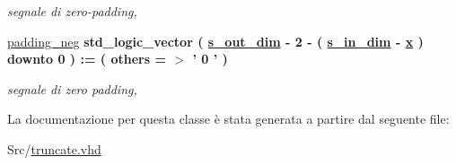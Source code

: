 \begin{DoxyCompactItemize}
\begin{DoxyCompactList}\small\item\em segnale di zero-\/padding, \end{DoxyCompactList}\item 
\hypertarget{classtruncate_1_1dataflow_ga130836df2917c4b75d1fc24500082e76}{\hyperlink{group___truncation_ga130836df2917c4b75d1fc24500082e76}{padding\+\_\+neg} {\bfseries \textcolor{vhdlchar}{std\+\_\+logic\+\_\+vector}\textcolor{vhdlchar}{ }\textcolor{vhdlchar}{(}\textcolor{vhdlchar}{ }\textcolor{vhdlchar}{ }\textcolor{vhdlchar}{ }\textcolor{vhdlchar}{ }{\bfseries \hyperlink{group___truncation_ga8b62f8bfecb0fab845995b8b051101bc}{s\+\_\+out\+\_\+dim}} \textcolor{vhdlchar}{-\/}\textcolor{vhdlchar}{ } \textcolor{vhdldigit}{2} \textcolor{vhdlchar}{-\/}\textcolor{vhdlchar}{ }\textcolor{vhdlchar}{(}\textcolor{vhdlchar}{ }\textcolor{vhdlchar}{ }\textcolor{vhdlchar}{ }\textcolor{vhdlchar}{ }{\bfseries \hyperlink{group___truncation_gad3d18243ad6fe53a2277e2aa9b94ca45}{s\+\_\+in\+\_\+dim}} \textcolor{vhdlchar}{-\/}\textcolor{vhdlchar}{ }\textcolor{vhdlchar}{ }\textcolor{vhdlchar}{ }{\bfseries \hyperlink{group___truncation_ga63701d8af27da7452a7588efcff357bc}{x}} \textcolor{vhdlchar}{ }\textcolor{vhdlchar}{)}\textcolor{vhdlchar}{ }\textcolor{vhdlchar}{ }\textcolor{vhdlchar}{downto}\textcolor{vhdlchar}{ }\textcolor{vhdlchar}{ } \textcolor{vhdldigit}{0} \textcolor{vhdlchar}{ }\textcolor{vhdlchar}{)}\textcolor{vhdlchar}{ }\textcolor{vhdlchar}{ }\textcolor{vhdlchar}{ }\textcolor{vhdlchar}{\+:}\textcolor{vhdlchar}{=}\textcolor{vhdlchar}{ }\textcolor{vhdlchar}{(}\textcolor{vhdlchar}{ }\textcolor{vhdlchar}{ }\textcolor{vhdlchar}{others}\textcolor{vhdlchar}{ }\textcolor{vhdlchar}{ }\textcolor{vhdlchar}{=}\textcolor{vhdlchar}{ }\textcolor{vhdlchar}{$>$}\textcolor{vhdlchar}{ }\textcolor{vhdlchar}{'}\textcolor{vhdlchar}{ } \textcolor{vhdldigit}{0} \textcolor{vhdlchar}{ }\textcolor{vhdlchar}{'}\textcolor{vhdlchar}{ }\textcolor{vhdlchar}{)}\textcolor{vhdlchar}{ }} }\label{classtruncate_1_1dataflow_ga130836df2917c4b75d1fc24500082e76}

\begin{DoxyCompactList}\small\item\em segnale di zero padding, \end{DoxyCompactList}\end{DoxyCompactItemize}


La documentazione per questa classe è stata generata a partire dal seguente file\+:\begin{DoxyCompactItemize}
\item 
Src/\hyperlink{truncate_8vhd}{truncate.\+vhd}\end{DoxyCompactItemize}
